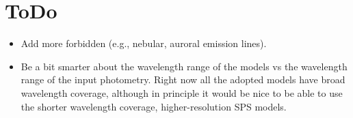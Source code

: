 \documentclass[12pt,preprint]{aastex}
\begin{document}
\section{ToDo}

\begin{itemize}
\item{Add more forbidden (e.g., nebular, auroral emission lines). }
\item{Be a bit smarter about the wavelength range of the models vs the
  wavelength range of the input photometry.  Right now all the adopted
  models have broad wavelength coverage, although in principle it
  would be nice to be able to use the shorter wavelength coverage,
  higher-resolution SPS models.}

\end{itemize}
\end{document}
